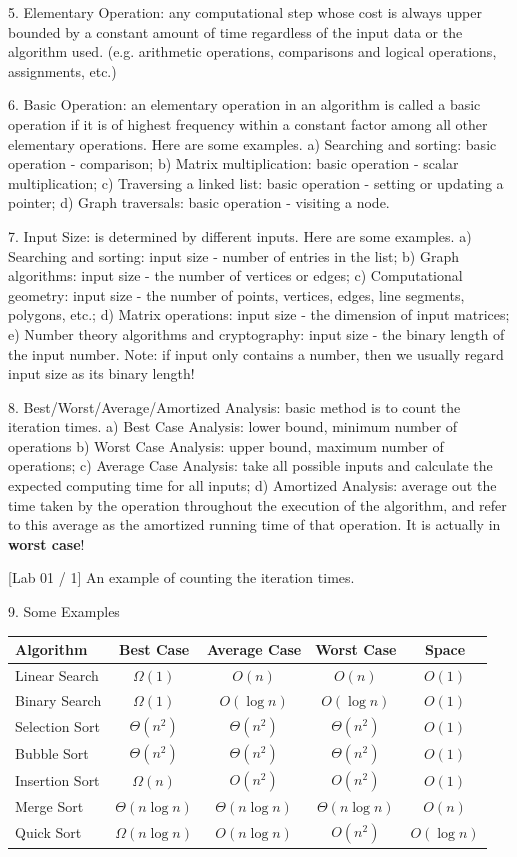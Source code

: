 \documentclass[10pt,a4paper]{article}
\begin{document}
5. Elementary Operation: any computational step whose cost is always upper bounded by a constant amount of time regardless of the input data or the algorithm used. (e.g. arithmetic operations, comparisons and logical operations, assignments, etc.)

6. Basic Operation: an elementary operation in an algorithm is called a basic operation if it is of highest frequency within a constant factor among all other elementary operations. Here are some examples.
a) Searching and sorting: basic operation - comparison;
b) Matrix multiplication: basic operation - scalar multiplication;
c) Traversing a linked list: basic operation - setting or updating a pointer;
d) Graph traversals: basic operation - visiting a node.

7. Input Size: is determined by different inputs. Here are some examples.
a) Searching and sorting: input size - number of entries in the list;
b) Graph algorithms: input size - the number of vertices or edges;
c) Computational geometry: input size - the number of points, vertices, edges, line segments, polygons, etc.;
d) Matrix operations: input size - the dimension of input matrices;
e) Number theory algorithms and cryptography: input size - the binary length of the input number.
Note: if input only contains a number, then we usually regard input size as its binary length!

8. Best/Worst/Average/Amortized Analysis: basic method is to count the iteration times.
a) Best Case Analysis: lower bound, minimum number of operations
b) Worst Case Analysis: upper bound, maximum number of operations;
c) Average Case Analysis: take all possible inputs and calculate the expected computing time for all inputs;
d) Amortized Analysis: average out the time taken by the operation throughout the execution of the algorithm, and refer to this average as the amortized running time of that operation. It is actually in \textbf{worst case}!

[Lab 01 / 1] An example of counting the iteration times.

9. Some Examples
\begin{center}
\begin{tabular}{lcccc}
\toprule
\textbf{Algorithm} & \textbf{Best Case} & \textbf{Average Case} & \textbf{Worst Case} & \textbf{Space} \\
\midrule
Linear Search & \(\Omega(1)\) & \(O(n)\) & \(O(n)\) & \(O(1)\) \\
Binary Search & \(\Omega(1)\) & \(O(\log n)\) & \(O(\log n)\) & \(O(1)\) \\
Selection Sort & \(\Theta(n^2)\) & \(\Theta(n^2)\) & \(\Theta(n^2)\) & \(O(1)\) \\
Bubble Sort & \(\Theta(n^2)\) & \(\Theta(n^2)\) & \(\Theta(n^2)\) & \(O(1)\) \\
Insertion Sort & \(\Omega(n)\) & \(O(n^2)\) & \(O(n^2)\) & \(O(1)\) \\
Merge Sort & \(\Theta(n\log n)\) & \(\Theta(n\log n)\) & \(\Theta(n\log n)\) & \(O(n)\) \\
Quick Sort & \(\Omega(n\log n)\) & \(O(n\log n)\) & \(O(n^2)\) & \(O(\log n)\) \\
\bottomrule
\end{tabular}
\end{center}
\end{document}
